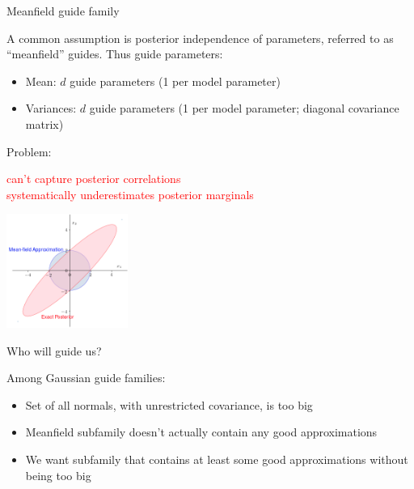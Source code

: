 \documentclass[
  ignorenonframetext,
]{beamer}
\providecommand{\tightlist}{%
  \setlength{\itemsep}{0pt}\setlength{\parskip}{0pt}}
\begin{document}
\begin{frame}{Meanfield guide family}
\protect\hypertarget{meanfield-guide-family}{}

A common assumption is posterior independence of parameters, referred to
as ``meanfield'' guides. Thus guide parameters:

\begin{itemize}
\tightlist
\item
  Mean: \(d\) guide parameters (1 per model parameter)
\item
  Variances: \(d\) guide parameters (1 per model parameter; diagonal
  covariance matrix)
\end{itemize}

Problem:

\textcolor{red}{{\scriptsize can’t capture posterior correlations\\systematically underestimates posterior marginals}}

\begin{center}\includegraphics[width=150px]{meanfield_covar_figure} \end{center}

\end{frame}

\begin{frame}{Who will guide us?}
\protect\hypertarget{who-will-guide-us}{}

Among Gaussian guide families:

\begin{itemize}
\tightlist
\item
  Set of all normals, with unrestricted covariance, is too big
\item
  Meanfield subfamily doesn't actually contain any good approximations
\item
  We want subfamily that contains at least some good approximations
  without being too big
\end{itemize}

\end{frame}
\end{document}
